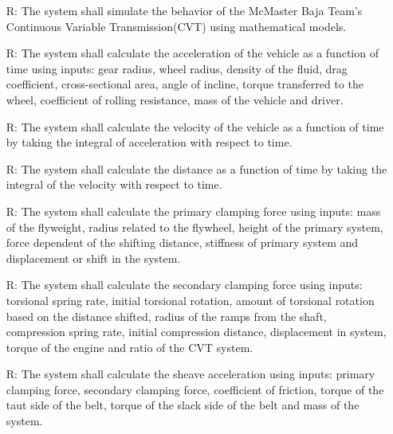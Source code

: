 \documentclass[12pt]{article}
\newcounter{reqnum} %
\begin{document}
\noindent \begin{itemize}

\item[R\refstepcounter{reqnum}\thereqnum \label{R_1}:] The system shall simulate the behavior of the McMaster Baja Team's Continuous Variable Transmission(CVT) using mathematical models.

\item[R\refstepcounter{reqnum}\thereqnum \label{R_2}:] The system shall calculate the acceleration of the vehicle as a function of time using inputs: gear radius, wheel radius, density of the fluid, drag coefficient, cross-sectional area, angle of incline, torque transferred to the wheel, coefficient of rolling resistance, mass of the vehicle and driver. 

\item[R\refstepcounter{reqnum}\thereqnum \label{R_3}:] The system shall calculate the velocity of the vehicle as a function of time by taking the integral of acceleration with respect to time.

\item[R\refstepcounter{reqnum}\thereqnum \label{R_4}:] The system shall calculate the distance as a function of time by taking the integral of the velocity with respect to time.

\item[R\refstepcounter{reqnum}\thereqnum \label{R_5}:] The system shall calculate the primary clamping force using inputs: mass of the flyweight, radius related to the flywheel, height of the primary system, force dependent of the shifting distance, stiffness of primary system and displacement or shift in the system. 

\item[R\refstepcounter{reqnum}\thereqnum \label{R_6}:] The system shall calculate the secondary clamping force using inputs: torsional spring rate, initial torsional rotation, amount of torsional rotation based on the distance shifted, radius of the ramps from the shaft, compression spring rate, initial compression distance, displacement in system, torque of the engine and ratio of the CVT system.

\item[R\refstepcounter{reqnum}\thereqnum \label{R_7}:] The system shall calculate the sheave acceleration using inputs: primary clamping force, secondary clamping force, coefficient of friction, torque of the taut side of the belt, torque of the slack side of the belt and mass of the system. 


\end{itemize}
\end{document}
